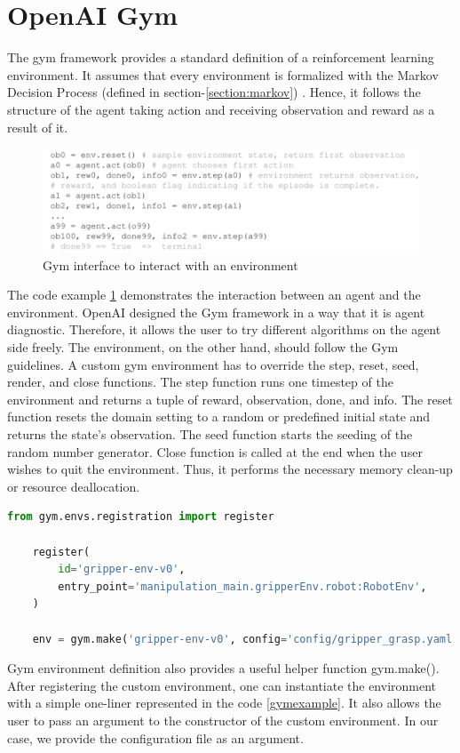 \section{OpenAI Gym}

The gym framework provides a standard definition of a reinforcement learning environment. It assumes that every environment is formalized with the Markov Decision Process (defined in section-\ref{section:markov}) \cite{OpenAIgym}. Hence, it follows the structure of the agent taking action and receiving observation and reward as a result of it.

\begin{figure}[htbp] 
    \centering
    \includegraphics[width=1.0\textwidth]{figures/gyminterface}
    \caption{Gym interface to interact with an environment}
    \label{fig:gyminterface}
\end{figure}


The code example \ref{fig:gyminterface} demonstrates the interaction between an agent and the environment. OpenAI designed the Gym framework in a way that it is agent diagnostic. Therefore, it allows the user to try different algorithms on the agent side freely. The environment, on the other hand, should follow the Gym guidelines. A custom gym environment has to override the step, reset, seed, render, and close functions. The step function runs one timestep of the environment and returns a tuple of reward, observation, done, and info. The reset function resets the domain setting to a random or predefined initial state and returns the state's observation. The seed function starts the seeding of the random number generator. Close function is called at the end when the user wishes to quit the environment. Thus, it performs the necessary memory clean-up or resource deallocation.

\begin{lstlisting}[language=Python, caption=Gym environment example instantiation, label=gymexample]
    from gym.envs.registration import register

    register(
        id='gripper-env-v0',
        entry_point='manipulation_main.gripperEnv.robot:RobotEnv',
    )

    env = gym.make('gripper-env-v0', config='config/gripper_grasp.yaml')
\end{lstlisting}

Gym environment definition also provides a useful helper function gym.make(). After registering the custom environment, one can instantiate the environment with a simple one-liner represented in the code \ref{gymexample}. It also allows the user to pass an argument to the constructor of the custom environment. In our case, we provide the configuration file as an argument.